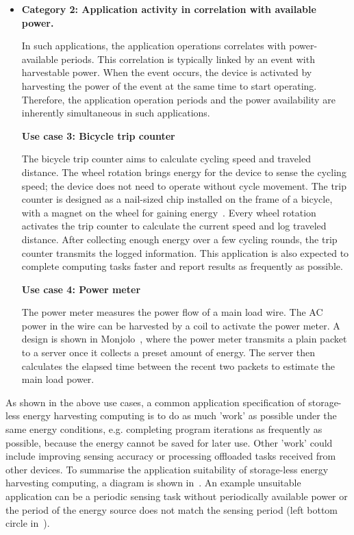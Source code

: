 \begin{itemize}
  \item \textbf{Category 2: Application activity in correlation with available power.}
  
  In such applications, the application operations correlates with power-available periods. This correlation is typically linked by an event with harvestable power. When the event occurs, the device is activated by harvesting the power of the event at the same time to start operating. Therefore, the application operation periods and the power availability are inherently simultaneous in such applications. 

  \textbf{Use case 3: Bicycle trip counter}

  The bicycle trip counter aims to calculate cycling speed and traveled distance. The wheel rotation brings energy for the device to sense the cycling speed; the device does not need to operate without cycle movement. The trip counter is designed as a nail-sized chip installed on the frame of a bicycle, with a magnet on the wheel for gaining energy~\cite{bing2018energy}. Every wheel rotation activates the trip counter to calculate the current speed and log traveled distance. After collecting enough energy over a few cycling rounds, the trip counter transmits the logged information. This application is also expected to complete computing tasks faster and report results as frequently as possible. 

  \textbf{Use case 4: Power meter}

  The power meter measures the power flow of a main load wire. The AC power in the wire can be harvested by a coil to activate the power meter. A design is shown in Monjolo~\cite{debruin2013monjolo}, where the power meter transmits a plain packet to a server once it collects a preset amount of energy. The server then calculates the elapsed time between the recent two packets to estimate the main load power. 

\end{itemize}
  
As shown in the above use cases, a common application specification of storage-less energy harvesting computing is to do as much 'work' as possible under the same energy conditions, e.g. completing program iterations as frequently as possible, because the energy cannot be saved for later use. Other 'work' could include improving sensing accuracy or processing offloaded tasks received from other devices. To summarise the application suitability of storage-less energy harvesting computing, a diagram is shown in~. An example unsuitable application can be a periodic sensing task without periodically available power or the period of the energy source does not match the sensing period (left bottom circle in~).

